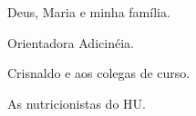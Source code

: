 \begin{agradecimentos}

Deus, Maria e minha família.

Orientadora Adicinéia.

Crisnaldo e aos colegas de curso.

As nutricionistas do HU.


\end{agradecimentos}
